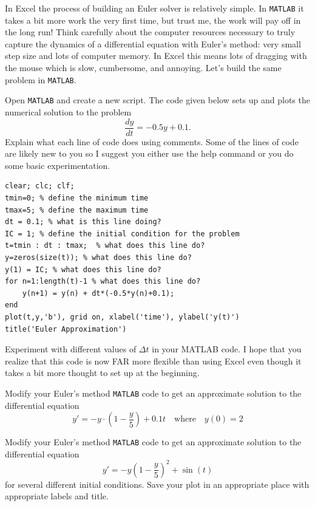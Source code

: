 In Excel the process of building an Euler solver is relatively simple.  In \texttt{MATLAB}
it takes a bit more work the very first time, but trust me, the work will pay off in the
long run!  Think carefully about the computer resources necessary to truly capture the
dynamics of a differential equation with Euler's method: very small step size and lots of
computer memory.  In Excel this means lots of dragging with the mouse which is slow,
cumbersome, and annoying.  Let's build the same problem in \texttt{MATLAB}.
\begin{problem}
    Open \texttt{MATLAB} and create a new script.  
    The code given below sets up and plots the numerical solution to the problem
    \[ \frac{dy}{dt} = -0.5 y + 0.1. \]
    Explain what each line of code
    does using comments. Some of the lines of code are likely new to you so I suggest you
    either use the help command or you do some basic experimentation.
\begin{lstlisting}
clear; clc; clf;
tmin=0; % define the minimum time
tmax=5; % define the maximum time
dt = 0.1; % what is this line doing?
IC = 1; % define the initial condition for the problem
t=tmin : dt : tmax;  % what does this line do?
y=zeros(size(t)); % what does this line do?
y(1) = IC; % what does this line do?
for n=1:length(t)-1 % what does this line do?
    y(n+1) = y(n) + dt*(-0.5*y(n)+0.1);
end
plot(t,y,'b'), grid on, xlabel('time'), ylabel('y(t)')
title('Euler Approximation')
\end{lstlisting}
\end{problem}

\begin{problem}
    Experiment with different values of $\Delta t$ in your MATLAB code.  I hope that you
    realize that this code is now FAR more flexible than using Excel even though it takes
    a bit more thought to set up at the beginning.
\end{problem}

\begin{problem}
    Modify your Euler's method \texttt{MATLAB} code to get an approximate solution to the differential equation
        \[ y' = -y \cdot \left( 1-\frac{y}{5} \right) + 0.1 t \quad \text{where} \quad
            y(0)=2 \]
\end{problem}

\begin{problem}
    Modify your Euler's method \texttt{MATLAB} code to get an approximate solution to the differential equation
        \[ y' = -y\left( 1-\frac{y}{5} \right)^2 + \sin(t) \]
        for several different initial conditions. Save your plot in an appropriate place
        with appropriate labels and title.
\end{problem}



